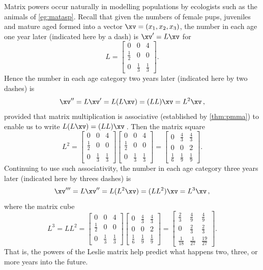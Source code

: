 \begin{example} \label{eg:poppred}
Matrix powers occur naturally in modelling populations by ecologists such as the animals of \autoref{eg:matasp}.
Recall that given the numbers of female pups, juveniles and mature aged formed into a vector \(\xv=(x_1,x_2,x_3)\), the number in each age one year later (indicated here by a dash) is \(\xv'=L\xv\) for 
\begin{equation*}
L=\begin{bmatrix} 0&0&4\\\frac12&0&0\\0&\frac13&\frac13 \end{bmatrix}.
\end{equation*}
Hence the number in each age category two years later (indicated here by two dashes) is
\begin{equation*}
\xv''=L\xv'=L(L\xv)=(LL)\xv=L^2\xv\,,
\end{equation*}
provided that matrix multiplication is associative (established by \autoref{thm:pmma}) to enable us to write \(L(L\xv)=(LL)\xv\)\,.
Then the matrix square
\begin{equation*}
L^2=\begin{bmatrix} 0&0&4\\\frac12&0&0\\0&\frac13&\frac13 \end{bmatrix}\begin{bmatrix} 0&0&4\\\frac12&0&0\\0&\frac13&\frac13 \end{bmatrix}
=\begin{bmatrix} 0&\frac43&\frac43\\0&0&2\\\frac16&\frac19&\frac19 \end{bmatrix}.
\end{equation*}
Continuing to use such associativity, 
the number in each age category three years later (indicated here by threes dashes) is
\begin{equation*}
\xv'''=L\xv''=L(L^2\xv)=(LL^2)\xv=L^3\xv\,,
\end{equation*}
where the matrix cube
\begin{equation*}
L^3=LL^2=\begin{bmatrix} 0&0&4\\\frac12&0&0\\0&\frac13&\frac13 \end{bmatrix}\begin{bmatrix} 0&\frac43&\frac43\\0&0&2\\\frac16&\frac19&\frac19 \end{bmatrix}
=\begin{bmatrix} \frac23&\frac49&\frac49\\ 0&\frac23&\frac23\\  \frac1{18}&\frac1{27}&\frac{19}{27}\end{bmatrix}.
\end{equation*}
That is, the powers of the Leslie matrix help predict what happens two, three, or more years into the future.
\end{example}
